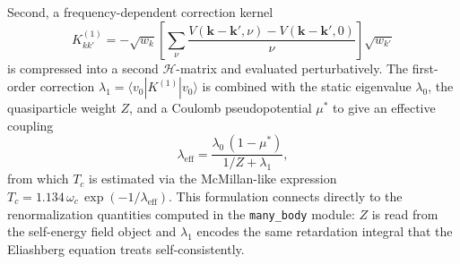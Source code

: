 Second, a frequency-dependent correction kernel
\[
    K^{(1)}_{kk'} = -\sqrt{w_k}
    \left[\sum_\nu \frac{V(\mathbf{k}-\mathbf{k}',\nu) - V(\mathbf{k}-\mathbf{k}',0)}{\nu}\right]
    \sqrt{w_{k'}}
\]
is compressed into a second $\mathcal{H}$-matrix and evaluated perturbatively.
The first-order correction $\lambda_1 = \langle v_0 | K^{(1)} | v_0 \rangle$ is
combined with the static eigenvalue $\lambda_0$, the quasiparticle weight $Z$, and
a Coulomb pseudopotential $\mu^*$ to give an effective coupling
\[
    \lambda_\mathrm{eff} = \frac{\lambda_0\,(1 - \mu^*)}{1/Z + \lambda_1},
\]
from which $T_c$ is estimated via the McMillan-like expression
$T_c = 1.134\,\omega_c\,\exp(-1/\lambda_\mathrm{eff})$.
This formulation connects directly to the renormalization quantities computed in
the \texttt{many\_body} module: $Z$ is read from the self-energy field object and
$\lambda_1$ encodes the same retardation integral that the Eliashberg equation
treats self-consistently.

\bigskip

